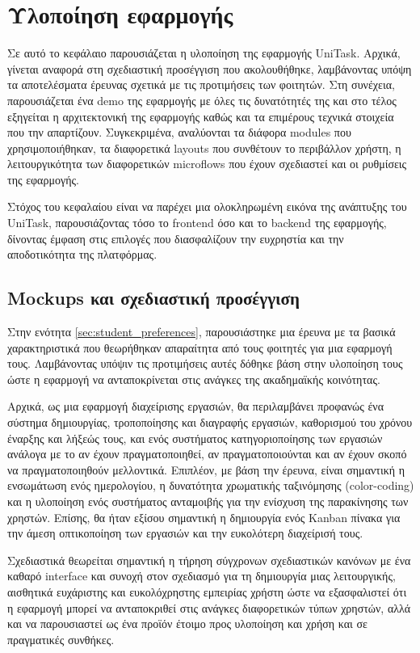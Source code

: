\chapter{Υλοποίηση εφαρμογής} \label{ch:unitask}
    Σε αυτό το κεφάλαιο παρουσιάζεται η υλοποίηση της εφαρμογής UniTask.  Αρχικά, γίνεται αναφορά στη σχεδιαστική προσέγγιση που ακολουθήθηκε, λαμβάνοντας υπόψη τα αποτελέσματα έρευνας σχετικά με τις προτιμήσεις των φοιτητών. Στη συνέχεια, παρουσιάζεται ένα demo της εφαρμογής με όλες τις δυνατότητές της και στο τέλος εξηγείται η αρχιτεκτονική της εφαρμογής καθώς και τα επιμέρους τεχνικά
    στοιχεία που την απαρτίζουν. Συγκεκριμένα, αναλύονται τα διάφορα modules που χρησιμοποιήθηκαν, τα διαφορετικά layouts που συνθέτουν το περιβάλλον χρήστη, η λειτουργικότητα των διαφορετικών microflows που έχουν σχεδιαστεί και οι ρυθμίσεις της εφαρμογής.

    Στόχος του κεφαλαίου είναι να παρέχει μια ολοκληρωμένη εικόνα της ανάπτυξης του UniTask, παρουσιάζοντας τόσο το frontend όσο και το backend της εφαρμογής, δίνοντας έμφαση στις επιλογές που διασφαλίζουν την ευχρηστία και την αποδοτικότητα της πλατφόρμας.

    \section{Mockups και σχεδιαστική προσέγγιση}
        Στην ενότητα \ref{sec:student_preferences}, παρουσιάστηκε μια έρευνα με τα βασικά χαρακτηριστικά που θεωρήθηκαν απαραίτητα από τους φοιτητές για μια εφαρμογή τους. Λαμβάνοντας υπόψιν τις προτιμήσεις αυτές δόθηκε βάση στην υλοποίηση τους ώστε η εφαρμογή να ανταποκρίνεται στις ανάγκες της ακαδημαϊκής κοινότητας.

        Αρχικά, ως μια εφαρμογή διαχείρισης εργασιών, θα περιλαμβάνει προφανώς ένα σύστημα δημιουργίας, τροποποίησης και διαγραφής εργασιών, καθορισμού του χρόνου έναρξης και λήξεώς τους, και ενός συστήματος κατηγοριοποίησης των εργασιών ανάλογα με το αν έχουν πραγματοποιηθεί, αν πραγματοποιούνται και αν έχουν σκοπό να πραγματοποιηθούν μελλοντικά. Επιπλέον, με βάση την έρευνα, είναι σημαντική η ενσωμάτωση ενός ημερολογίου, η δυνατότητα χρωματικής ταξινόμησης (color-coding) και η υλοποίηση ενός συστήματος ανταμοιβής για την ενίσχυση της παρακίνησης των χρηστών. Επίσης, θα ήταν εξίσου σημαντική η δημιουργία ενός Kanban πίνακα για την άμεση οπτικοποίηση των εργασιών και την ευκολότερη διαχείρισή τους.

        Σχεδιαστικά θεωρείται σημαντική η τήρηση σύγχρονων σχεδιαστικών κανόνων με ένα καθαρό interface και συνοχή στον σχεδιασμό για τη δημιουργία μιας λειτουργικής, αισθητικά ευχάριστης και ευκολόχρηστης εμπειρίας χρήστη ώστε να εξασφαλιστεί ότι η εφαρμογή μπορεί να ανταποκριθεί στις ανάγκες διαφορετικών τύπων χρηστών, αλλά και να παρουσιαστεί ως ένα προϊόν έτοιμο προς υλοποίηση και χρήση και σε πραγματικές συνθήκες.

